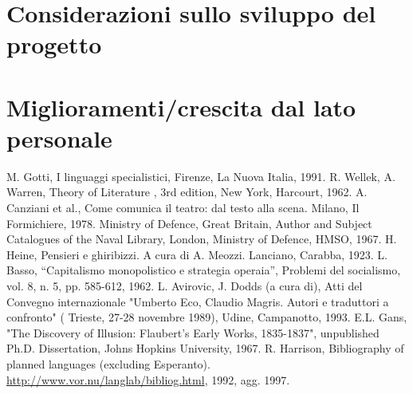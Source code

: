 \documentclass[12pt]{report}
\begin{document}
\newpage
\section{Considerazioni sullo sviluppo del progetto}

\newpage
\section{Miglioramenti/crescita dal lato personale}


%
%

%
%
\begin{thebibliography}{00}
%
M. Gotti, I linguaggi specialistici, Firenze, La Nuova Italia, 1991.
%
R. Wellek, A. Warren, Theory of Literature , 3rd edition, New York, Harcourt, 1962.
%
A. Canziani et al., Come comunica il teatro: dal testo alla scena. Milano, Il Formichiere, 1978.
%
Ministry of Defence, Great Britain, Author and Subject Catalogues of the Naval Library, London, Ministry of Defence, HMSO, 1967.
%
H. Heine, Pensieri e ghiribizzi. A cura di A. Meozzi. Lanciano, Carabba, 1923.
%
L. Basso, ``Capitalismo monopolistico e strategia operaia'', Problemi del socialismo, vol. 8, n. 5, pp. 585-612, 1962.
%
L. Avirovic, J. Dodds (a cura di), Atti del Convegno internazionale "Umberto Eco, Claudio Magris. Autori e traduttori a confronto" ( Trieste, 27-28 novembre 1989), Udine, Campanotto, 1993.
%
E.L. Gans, "The Discovery of Illusion: Flaubert's Early Works, 1835-1837", unpublished Ph.D. Dissertation, Johns Hopkins University, 1967.
%
R. Harrison, Bibliography of planned languages (excluding Esperanto).  \url{http://www.vor.nu/langlab/bibliog.html}, 1992, agg. 1997.
%
\end{thebibliography}
% 
\end{document}
